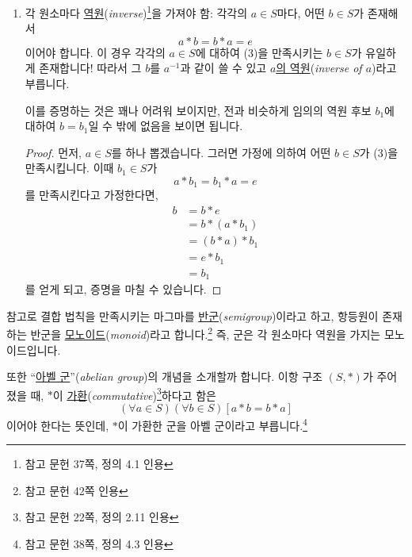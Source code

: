 \documentclass[12pt]{paper}
\begin{document}
\begin{enumerate}
    \item 각 원소마다 \underline{역원}(\textit{inverse})\footnote{참고 문헌 \cite{fraleigh2009} 37쪽, 정의 4.1 인용}을 가져야 함:
    각각의 $a \in S$마다, 어떤 $b \in S$가 존재해서
    \begin{equation*}
      a * b = b * a = e \tag{3}
    \end{equation*}
    이어야 합니다.
    이 경우 각각의 $a \in S$에 대하여 (3)을 만족시키는 $b \in S$가 유일하게 존재합니다!
    따라서 그 $b$를 $a^{-1}$과 같이 쓸 수 있고 \underline{$a$의 역원}(\textit{inverse of $a$})라고 부릅니다.

    이를 증명하는 것은 꽤나 어려워 보이지만,
    전과 비슷하게 임의의 역원 후보 $b_1$에 대하여 $b = b_1$일 수 밖에 없음을 보이면 됩니다.

    \begin{proof}
      먼저, $a \in S$를 하나 뽑겠습니다.
      그러면 가정에 의하여 어떤 $b \in S$가 (3)을 만족시킵니다.
      이때 $b_1 \in S$가
      \begin{equation*}
        a * b_1 = b_1 * a = e \tag{3-1}
      \end{equation*}
      를 만족시킨다고 가정한다면,
      \begin{align*}
        b
        & = b * e \tag{by (2)} \\
        & = b * (a * b_1) \tag{by (3-1)} \\
        & = (b * a) * b_1 \tag{by (1)} \\
        & = e * b_1 \tag{by (3)} \\
        & = b_1 \tag{by (2)}
      \end{align*}
      를 얻게 되고,
      증명을 마칠 수 있습니다.
    \end{proof}
  \end{enumerate}

  참고로 결합 법칙을 만족시키는 마그마를 \underline{반군}(\textit{semigroup})이라고 하고,
  항등원이 존재하는 반군을 \underline{모노이드}(\textit{monoid})라고 합니다.\footnote{참고 문헌 \cite{fraleigh2009} 42쪽 인용}
  즉, 군은 각 원소마다 역원을 가지는 모노이드입니다.

  또한 ``\underline{아벨 군}''(\textit{abelian group})의 개념을 소개할까 합니다.
  이항 구조 $\left( S , * \right)$가 주어졌을 때,
  $*$이 \underline{가환}(\textit{commutative})\footnote{참고 문헌 \cite{fraleigh2009} 22쪽, 정의 2.11 인용}하다고 함은
  \begin{equation*}
    \left( \forall a \in S \right) \left( \forall b \in S \right) \left[ a * b = b * a \right] \tag{4}
  \end{equation*}
  이어야 한다는 뜻인데,
  $*$이 가환한 군을 아벨 군이라고 부릅니다.\footnote{참고 문헌 \cite{fraleigh2009} 38쪽, 정의 4.3 인용}
\end{document}
